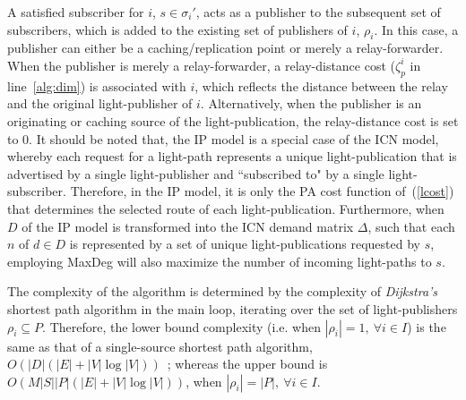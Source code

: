 \documentclass[journal]{IEEEtran}
\begin{document}
A satisfied subscriber for $i$, $s \in \sigma_i'$, acts as a
publisher to the subsequent set of subscribers, which is added
to the existing set of publishers of $i$, $\rho_i$. In this case, a
publisher can either be a caching/replication point or merely a
relay-forwarder. When the publisher is merely a relay-forwarder, a relay-distance cost ($\zeta_p^i$ in line~\ref{alg:dim}) is associated with $i$, which reflects the distance between the relay and the original light-publisher of $i$.
Alternatively, when the publisher is an originating or caching source of the light-publication, the relay-distance cost is set to $0$.
 It should be noted that, the IP model is a special case of the ICN model,
 whereby each request for a light-path represents a unique
 light-publication that is advertised by a single light-publisher and
 ``subscribed to" by a single light-subscriber. Therefore, in the IP
 model, it is only the PA cost function of~(\ref{lcost}) that
 determines the selected route of each light-publication. Furthermore,
 when $D$ of the IP model is transformed into the ICN demand matrix
 $\Delta$, such that each $n$ of $d \in D$ is represented by a set of
 unique light-publications requested by $s$, employing MaxDeg will
 also maximize the number of incoming light-paths to $s$. 

 The complexity of the algorithm is determined by the complexity of
 \emph{Dijkstra's} shortest path algorithm in the main loop,
 iterating over the set of light-publishers $\rho_i \subseteq
 P$.
 Therefore, the lower bound complexity
 (i.e. when $|\rho_i|=1, \ \forall i \in I$) is the same as that of a
 single-source shortest path algorithm,
 $O(|D|(|E| + |V|\log|V|))$~\cite{dij:com}; whereas the upper bound is
 $O(M|S||P|(|E| + |V|\log|V|))$, when
 $|\rho_i| = |P|, \ \forall i \in I $.
\end{document}
